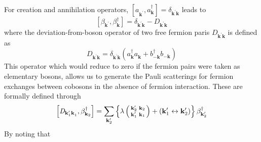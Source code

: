 \documentclass[aps,prb,superscriptaddress,showpacs,reprint,lengthcheck]{revtex4-1}
\newcommand{\vk}{\ensuremath{\mathbf{k}}}
\begin{document}
For creation and annihilation operators, $\left[a^{}_{\mathbf{k}
^{\prime}},a^{\dagger}_{\mathbf{k} {}}\right]  =\delta_{\mathbf{k} ^{\prime}%
\mathbf{k} }$ leads to 
\begin{equation}  \label{eq:betacom}
\left[\beta_{\mathbf{k} ^{\prime}},\beta^{\dagger}_{\mathbf{k} }\right] 
=\delta_{\mathbf{k} ^{\prime}\mathbf{k} }-\mathit{D} _{\mathbf{k} ^{\prime}%
\mathbf{k} }
\end{equation}
where the deviation-from-boson operator of two free fermion paris $\mathit{D} _{\mathbf{k} ^{\prime}\mathbf{k%
} }$ is defined as 
\begin{equation}  \label{eq:D}
\mathit{D} _{\mathbf{k} ^{\prime}\mathbf{k} }=\delta_{\mathbf{k} ^{\prime}%
\mathbf{k} }\left(a^{\dagger}_{\mathbf{k}}a^{}_{\mathbf{k}
}+b^{\dagger}_{-\mathbf{k} }b^{}_{-\mathbf{k}
}\right) 
\end{equation}
This operator which would reduce to zero if the fermion pairs were taken as
elementary bosons, allows us to generate the Pauli scatterings for fermion
exchanges between cobosons in the absence of fermion interaction. These are formally defined through \cite%
{CobosonPhysicsReports} 
\begin{equation}
\left[\mathit{D} _{\mathbf{k} ^{\prime}_1\mathbf{k} ^{}_1},\beta^{\dagger}_{%
\mathbf{k} _2}\right]  =\sum_{\mathbf{k} ^{\prime}_2}\left\{\lambda\left(%
\begin{smallmatrix}\vk'_2&\vk_2\\\vk'_1&\vk_1\end{smallmatrix}\right) 
+\left(\mathbf{k} ^{\prime}_1\leftrightarrow\mathbf{k} ^{\prime}_2\right)
\right\} \beta^{\dagger}_{\mathbf{k} ^{\prime}_2}
\end{equation}
By noting that
\end{document}

